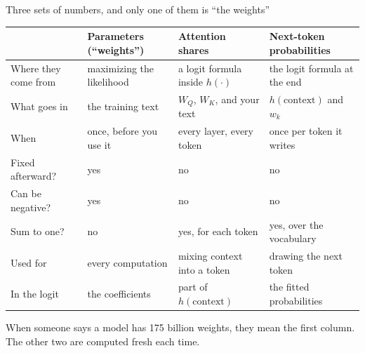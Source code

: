 \documentclass[aspectratio=169,11pt]{beamer}
\begin{document}
\begin{frame}{Three sets of numbers, and only one of them is ``the weights''}

\begin{center}
\scriptsize\setlength{\tabcolsep}{4pt}
\begin{tabular}{@{}llll@{}}
\toprule
 & \textbf{Parameters (``weights'')} & \textbf{Attention shares} & \textbf{Next-token probabilities} \\
\midrule
Where they come from & maximizing the likelihood & a logit formula inside $h(\cdot)$ & the logit formula at the end \\
What goes in & the training text & $W_Q$, $W_K$, and your text & $h(\text{context})$ and $w_k$ \\
When & once, before you use it & every layer, every token & once per token it writes \\
Fixed afterward? & yes & no & no \\
Can be negative? & yes & no & no \\
Sum to one? & no & yes, for each token & yes, over the vocabulary \\
Used for & every computation & mixing context into a token & drawing the next token \\
In the logit & the coefficients & part of $h(\text{context})$ & the fitted probabilities \\
\bottomrule
\end{tabular}
\end{center}

\vspace{0.3cm}

\alert{When someone says a model has 175 billion weights, they mean the first column. The other two are computed fresh each time.}

\end{frame}

\end{document}
